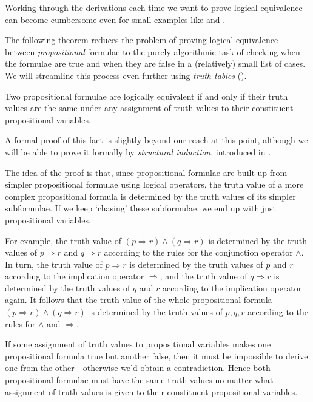 Working through the derivations each time we want to prove logical equivalence can become cumbersome even for small examples like  and .

The following theorem reduces the problem of proving logical equivalence between \textit{propositional} formulae to the purely algorithmic task of checking when the formulae are true and when they are false in a (relatively) small list of cases. We will streamline this process even further using \textit{truth tables} ().

\begin{theorem}
\label{thmLogicalEquivalentIffSameTruthValues}
Two propositional formulae are logically equivalent if and only if their truth values are the same under any assignment of truth values to their constituent propositional variables.
\end{theorem}

\begin{cidea}
A formal proof of this fact is slightly beyond our reach at this point, although we will be able to prove it formally by \textit{structural induction}, introduced in .

The idea of the proof is that, since propositional formulae are built up from simpler propositional formulae using logical operators, the truth value of a more complex propositional formula is determined by the truth values of its simpler subformulae. If we keep `chasing' these subformulae, we end up with just propositional variables.

For example, the truth value of $(p \Rightarrow r) \wedge (q \Rightarrow r)$ is determined by the truth values of $p \Rightarrow r$ and $q \Rightarrow r$ according to the rules for the conjunction operator $\wedge$. In turn, the truth value of $p \Rightarrow r$ is determined by the truth values of $p$ and $r$ according to the implication operator $\Rightarrow$, and the truth value of $q \Rightarrow r$ is determined by the truth values of $q$ and $r$ according to the implication operator again. It follows that the truth value of the whole propositional formula $(p \Rightarrow r) \wedge (q \Rightarrow r)$ is determined by the truth values of $p,q,r$ according to the rules for $\wedge$ and $\Rightarrow$.

If some assignment of truth values to propositional variables makes one propositional formula true but another false, then it must be impossible to derive one from the other---otherwise we'd obtain a contradiction. Hence both propositional formulae must have the same truth values no matter what assignment of truth values is given to their constituent propositional variables.
\end{cidea}

